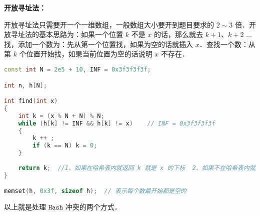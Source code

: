 \textbf{开放寻址法：}

开放寻址法只需要开一个一维数组，一般数组大小要开到题目要求的 $2 \sim 3$ 倍．开放寻址法的基本思路为：如果一个位置 $k$ 不是 $x$ 的话，那么就去 $k + 1$、$k + 2$ ... 找，添加一个数为：先从第一个位置找，如果为空的话就插入 $x$．查找一个数：从第 $k$ 个位置开始找，如果当前位置为空的话说明 $x$ 不存在．

\begin{lstlisting}[language=cpp]
const int N = 2e5 + 10, INF = 0x3f3f3f3f;

int n, h[N];

int find(int x)
{
    int k = (x % N + N) % N;
    while (h[k] != INF && h[k] != x)    // INF = 0x3f3f3f3f
    {
        k ++ ;
        if (k == N) k = 0;
    }
    
    return k;  //1、如果在哈希表内就返回 k 就是 x 的下标  2、如果不在哈希表内就返回应该存储的位置
}

memset(h, 0x3f, sizeof h);  // 表示每个数最开始都是空的
\end{lstlisting}

以上就是处理 $\mathtt{Hash}$ 冲突的两个方式．